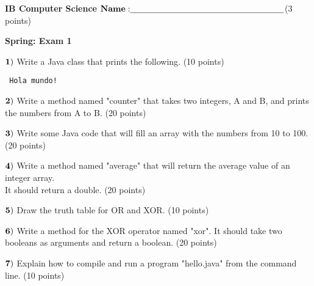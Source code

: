 \documentclass{article}
\begin{document}

\doublespacing
\textbf{IB Computer Science }                        %
 \hfill                             %
$ {\bf Name: } \underline{\hspace{2.5in}}$(3 points)

\begin{centering}
\vspace{1cm}
\textbf{Spring: Exam 1}\\
\end{centering}
\vspace{1cm}
 

  
 
 $\bf{1)}$ Write a Java class that prints the following. (10 points)
  
   \begin{verbatim}
 Hola mundo!
 \end{verbatim}
 
 $\bf{2)}$ Write a method named "counter" that takes two integers, A and B, and prints the numbers from A to B. (20 points)
  \vspace{0.5cm}
 
  $\bf{3)}$ Write some Java code that will fill an array with the numbers from 10 to 100.  (20 points)
   \vspace{0.5cm}
   
  $\bf{4)}$ Write a method named "average" that will return the average value of an integer array. \\
   It should return a double.  (20 points)
   \vspace{0.5cm}
   
  $\bf{5)}$ Draw the truth table for OR and XOR.  (10 points)
   \vspace{0.5cm}
   
  $\bf{6)}$ Write a method for the XOR operator named "xor".  It should take two booleans as arguments and return a boolean.  (20 points)
   \vspace{0.5cm}
   
   $\bf{7)}$ Explain how to compile and run a program "hello.java" from the command line.  (10 points)
  


  
  
  
    

 
\end{document}
